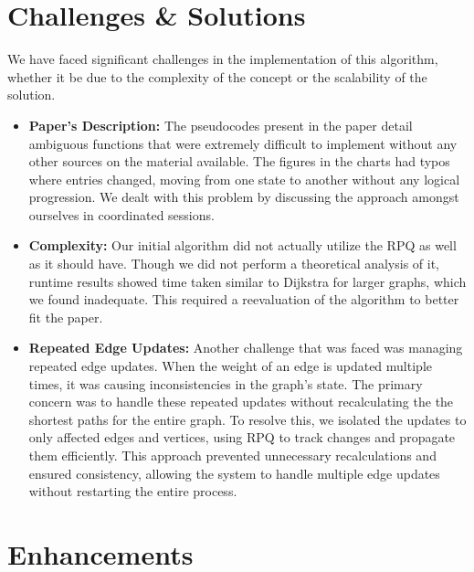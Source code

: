 \documentclass[12pt]{article}
\begin{document}
\section*{Challenges \& Solutions}

We have faced significant challenges in the implementation of this algorithm, whether it be due to the complexity of the concept or the scalability of the solution.
\begin{itemize}
    \item \textbf{Paper's Description:} The pseudocodes present in the paper detail ambiguous functions that were extremely difficult to implement without any other sources on the material available. The figures in the charts had typos where entries changed, moving from one state to another without any logical progression. We dealt with this problem by discussing the approach amongst ourselves in coordinated sessions. 

    \item \textbf{Complexity:} Our initial algorithm did not actually utilize the RPQ as well as it should have. Though we did not perform a theoretical analysis of it, runtime results showed time taken similar to Dijkstra for larger graphs, which we found inadequate. This required a reevaluation of the algorithm to better fit the paper.

\item \textbf{Repeated Edge Updates:} Another challenge that was faced was managing repeated edge updates. When the weight of an edge is updated multiple times, it was causing inconsistencies in the graph’s state. The primary concern was to handle these repeated updates without recalculating the the shortest paths for the entire graph. To resolve this, we isolated the updates to only affected edges and vertices, using RPQ to track changes and propagate them efficiently. This approach prevented unnecessary recalculations and ensured consistency, allowing the system to handle multiple edge updates without restarting the entire process.

\end{itemize}



\section*{Enhancements}
\end{document}
